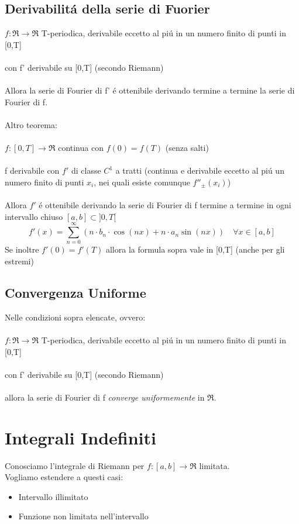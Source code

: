 \documentclass[a4paper,10pt,italian]{article}
\begin{document}
\subsection{Derivabilit\'a della serie di Fuorier}
$f:\Re \rightarrow \Re$ T-periodica, derivabile eccetto al pi\'u in un numero finito di punti in [0,T] \\ \\
con f' derivabile su [0,T] (secondo Riemann) \\ \\
Allora la serie di Fourier di f' \'e ottenibile derivando termine a termine la serie di Fourier di f. \\ \\
Altro teorema: \\ \\
$f:[0,T]\rightarrow \Re$ continua con $f(0)=f(T)$ (senza salti) \\ \\
f derivabile con $f'$ di classe $C^1$ a tratti (continua e derivabile eccetto al pi\'u un numero finito di punti $x_i$,
nei quali esiste comunque $f''_\pm (x_i)$) \\ \\
Allora $f'$ \'e ottenibile derivando la serie di Fourier di f termine a termine in ogni intervallo chiuso $[a,b]\subset ]0,T[$ 
$$ f'(x) = \sum_{n=0}^{\infty}(n\cdot b_n\cdot \cos(nx) + n\cdot a_n \sin(nx)) \quad \forall x \in [a,b]$$
Se inoltre $f'(0)=f'(T)$ allora la formula sopra vale in [0,T] (anche per gli estremi)

\subsection{Convergenza Uniforme}
Nelle condizioni sopra elencate, ovvero:\\ \\
$f:\Re \rightarrow \Re$ T-periodica, derivabile eccetto al pi\'u in un numero finito di punti in [0,T] \\ \\
con f' derivabile su [0,T] (secondo Riemann) \\ \\
allora la serie di Fourier di f \emph{converge uniformemente} in $\Re$.

\section{Integrali Indefiniti}
Conosciamo l'integrale di Riemann per $f:[a,b]\rightarrow \Re$ limitata.\\
Vogliamo estendere a questi casi:
\begin{itemize}
\item Intervallo illimitato
\item Funzione non limitata nell'intervallo
\end{itemize}
\end{document}
